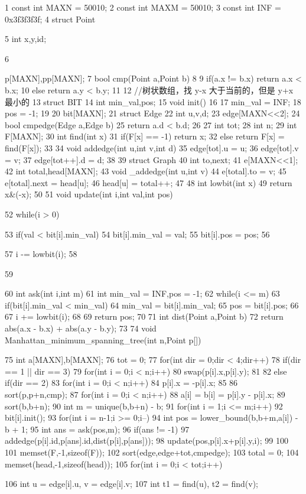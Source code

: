 \documentclass[11pt]{article}
\begin{document}
\begin{Code}
1   const int MAXN = 50010;
2   const int MAXM = 50010;
3   const int INF = 0x3f3f3f3f;
4   struct Point{
5       int x,y,id;


 6   }p[MAXN],pp[MAXN];
 7   bool cmp(Point a,Point b)
 8   {
 9       if(a.x != b.x) return a.x < b.x;
10       else return a.y < b.y;
11   }
12   //树状数组，找 y-x 大于当前的，但是 y+x 最小的
13   struct BIT{
14       int min_val,pos;
15       void init()
16       {
17           min_val = INF;
18           pos = -1;
19       }
20   }bit[MAXN];
21   struct Edge{
22       int u,v,d;
23   }edge[MAXN<<2];
24   bool cmpedge(Edge a,Edge b){
25       return a.d < b.d;
26   }
27   int tot;
28   int n;
29   int F[MAXN];
30   int find(int x){
31       if(F[x] == -1) return x;
32       else return F[x] = find(F[x]);
33   }
34   void addedge(int u,int v,int d){
35       edge[tot].u = u;
36       edge[tot].v = v;
37       edge[tot++].d = d;
38   }
39   struct Graph{
40       int to,next;
41   }e[MAXN<<1];
42   int total,head[MAXN];
43   void _addedge(int u,int v){
44       e[total].to = v;
45       e[total].next = head[u];
46       head[u] = total++;
47   }
48   int lowbit(int x){
49       return x&(-x);
50   }
51   void update(int i,int val,int pos){
52       while(i > 0){
53           if(val < bit[i].min_val){
54                bit[i].min_val = val;
55                bit[i].pos = pos;
56           }


 57              i -= lowbit(i);
 58       }
 59   }
 60   int ask(int i,int m){
 61       int min_val = INF,pos = -1;
 62       while(i <= m){
 63           if(bit[i].min_val < min_val){
 64                min_val = bit[i].min_val;
 65                pos = bit[i].pos;
 66           }
 67           i += lowbit(i);
 68       }
 69       return pos;
 70   }
 71   int dist(Point a,Point b){
 72       return abs(a.x - b.x) + abs(a.y - b.y);
 73   }
 74   void Manhattan_minimum_spanning_tree(int n,Point p[]){
 75       int a[MAXN],b[MAXN];
 76       tot = 0;
 77       for(int dir = 0;dir < 4;dir++){
 78           if(dir == 1 || dir == 3){
 79                for(int i = 0;i < n;i++)
 80                    swap(p[i].x,p[i].y);
 81           }
 82           else if(dir == 2){
 83                for(int i = 0;i < n;i++)
 84                    p[i].x = -p[i].x;
 85           }
 86           sort(p,p+n,cmp);
 87           for(int i = 0;i < n;i++)
 88                a[i] = b[i] = p[i].y - p[i].x;
 89           sort(b,b+n);
 90           int m = unique(b,b+n) - b;
 91           for(int i = 1;i <= m;i++)
 92                bit[i].init();
 93           for(int i = n-1;i >= 0;i--){
 94                int pos = lower_bound(b,b+m,a[i]) - b + 1;
 95                int ans = ask(pos,m);
 96                if(ans != -1)
 97                    addedge(p[i].id,p[ans].id,dist(p[i],p[ans]));
 98                update(pos,p[i].x+p[i].y,i);
 99           }
100       }
101       memset(F,-1,sizeof(F));
102       sort(edge,edge+tot,cmpedge);
103       total = 0;
104       memset(head,-1,sizeof(head));
105       for(int i = 0;i < tot;i++){
106           int u = edge[i].u, v = edge[i].v;
107           int t1 = find(u), t2 = find(v);


}}
\end{Code}
\end{document}
